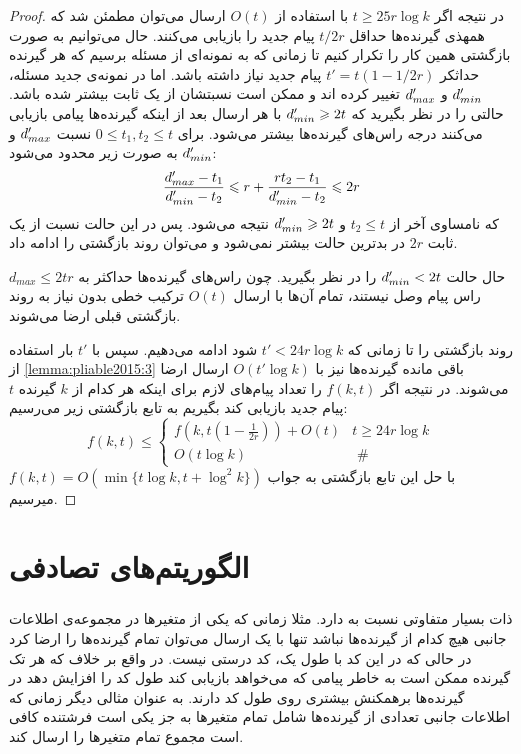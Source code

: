 \begin{proof}
	در نتیجه اگر
	$t \geq 25 r \log k$
	با استفاده از
	$O(t)$
	ارسال می‌توان مطمئن شد که همهذی گیرنده‌ها حداقل
	$t/2r$
	پیام جدید را بازیابی می‌کنند. حال می‌توانیم به صورت بازگشتی همین کار را تکرار کنیم تا زمانی که به نمونه‌ای از مسئله برسیم که هر گیرنده حداثکر
	$t' = t(1 - 1/2r)$
	پیام جدید نیاز داشته باشد. اما در نمونه‌ی جدید مسئله،
	$d_{min}'$
	و
	$d_{max}'$
	تغییر کرده اند و ممکن است نسبتشان از یک ثابت بیشتر شده باشد. حالتی را در نظر بگیرید که
	$d_{min}' \geqslant 2t$
	با هر ارسال بعد از اینکه گیرنده‌ها پیامی بازیابی می‌کنند درجه راس‌های گیرنده‌ها بیشتر می‌شود. برای
	$0 \leq t_1, t_2 \leq t$
	نسبت
	$d_{max}'$
	و
	$d_{min}'$
	به صورت زیر محدود می‌شود:
	\begin{equation}
		\dfrac{d_{max}' - t_1}{d_{min}' - t_2} \leqslant r + \dfrac{rt_2 - t_1}{d_{min}' - t_2} \leqslant 2r
	\end{equation}
	که نامساوی آخر از 
	$t_2 \leq t$
	و
	$d_{min}' \geqslant 2t$
	نتیجه می‌شود. پس در این حالت نسبت از یک ثابت
	$2r$
	در بدترین حالت بیشتر نمی‌شود و می‌توان روند بازگشتی را ادامه داد.
	
	حال حالت
	$d_{min}' < 2t$
	را در نظر بگیرید. چون راس‌های گیرنده‌ها حداکثر به
	$d_{max} \leq 2tr$
	راس پیام وصل نیستند، تمام آن‌ها با ارسال
	$O(t)$
	ترکیب خطی بدون نیاز به روند بازگشتی قبلی ارضا می‌شوند.
	
	روند بازگشتی را تا زمانی که
	$t' < 24r \log k$
	شود ادامه می‌دهیم. سپس با 
	$t'$
	بار استفاده از 
	\autoref{lemma:pliable2015:3}
	باقی مانده گیرنده‌ها نیز با
	$O(t' \log k)$
	ارسال ارضا می‌شوند. در نتیجه اگر
	$f(k, t)$
	را تعداد پیام‌های لازم برای اینکه هر کدام از
	$k$
	گیرنده
	$t$
	پیام جدید بازیابی کند بگیریم به تابع بازگشتی زیر می‌رسیم:
	\begin{equation}
		f(k, t) \leq \begin{cases}f\left(k, t\left(1-\frac{1}{2 r}\right)\right)+O(t) & t \geq 24 r \log k \\ O(t \log k) & \text { \# }\end{cases}
	\end{equation}
	با حل این تابع بازگشتی به جواب
	$f(k, t) = O(\min\{t \log k, t + \log^2 k\})$
	میرسیم.
\end{proof}

\section{
الگوریتم‌های تصادفی
}
\subsubsection{
}
\picod
ذات بسیار متفاوتی نسبت به
\icod
دارد. مثلا زمانی که یکی از متغیرها در مجموعه‌ی اطلاعات جانبی هیچ کدام از گیرنده‌ها نباشد تنها با یک ارسال می‌توان تمام گیرنده‌ها را ارضا کرد در حالی که در
\icod
این کد با طول یک، کد درستی نیست. در واقع بر خلاف
\icod
که هر تک گیرنده ممکن است به خاطر پیامی که می‌خواهد بازیابی کند طول کد را افزایش دهد در
\picod
گیرنده‌ها برهمکنش بیشتری روی طول کد دارند. به عنوان مثالی دیگر زمانی که اطلاعات جانبی تعدادی از گیرنده‌ها شامل تمام متغیرها به جز یکی است فرشتنده کافی است مجموع تمام متغیرها را ارسال کند. 

